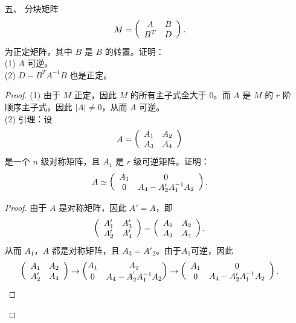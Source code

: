 \begin{enumerate}[1~]
\item[五、]
分块矩阵\[
M=\left( \begin{array} { c c } { A } & { B } \\ { B ^ { T } } & { D } \end{array} \right).
\]
为正定矩阵，其中 $B$ 是 $B$ 的转置。证明：\\
(1) $A$ 可逆。\\
(2) $D - B^T A^{-1}B$ 也是正定。
\begin{proof}
(1) 由于 $M$ 正定，因此 $M$ 的所有主子式全大于 $0$。而 $A$ 是 $M$ 的 $r$ 阶顺序主子式，因此 $|A|\ne 0$，从而 $A$ 可逆。\\
(2) 引理：设\[
A = \left( \begin{array} { l l } { A _ { 1 } } & { A _ { 2 } } \\ { A _ { 3 } } & { A _ { 4 } } \end{array} \right)
\]
是一个 $ n $ 级对称矩阵，且 $A_1$ 是 $r$ 级可逆矩阵。证明：\[
A \simeq \left( \begin{array} { c c } { A _ { 1 } } & { 0 } \\ { 0 } & { A _ { 4 } - A _ { 2 } ^ { \prime } A _ { 1 } ^ { - 1 } A _ { 2 } } \end{array} \right).
\]
\begin{proof}
由于 $ A $ 是对称矩阵，因此 $A'=A$，即\[
\left( \begin{array} { c c } { A _ { 1 } ^ { \prime } } & { A _ { 3 } ^ { \prime } } \\ { A _ { 2 } ^ { \prime } } & { A _ { 4 } ^ { \prime } } \end{array} \right) = \left( \begin{array} { l l } { A _ { 1 } } & { A _ { 2 } } \\ { A _ { 3 } } & { A _ { 4 } } \end{array} \right).
\]
从而 $A_1$，$A$ 都是对称矩阵，且 $A_3=A'_2$。由于$A_1$可逆，因此\[
\left( \begin{array} { l l } { A _ { 1 } } & { A _ { 2 } } \\ { A _ { 2 } ^ { \prime } } & { A _ { 4 } } \end{array} \right)\rightarrow \left( \begin{matrix}
	A_1&		A_2\\
	0&		A_4-A_{2}^{'}A_{1}^{-1}A_2\\
\end{matrix} \right) \rightarrow \left( \begin{array} { c c } { A _ { 1 } } & { 0 } \\ { 0 } & { A _ { 4 } - A _ { 2 } ^ { \prime } A _ { 1 } ^ { - 1 } A _ { 2 } } \end{array} \right).
\]
\end{proof}
\end{proof}
\end{enumerate}
